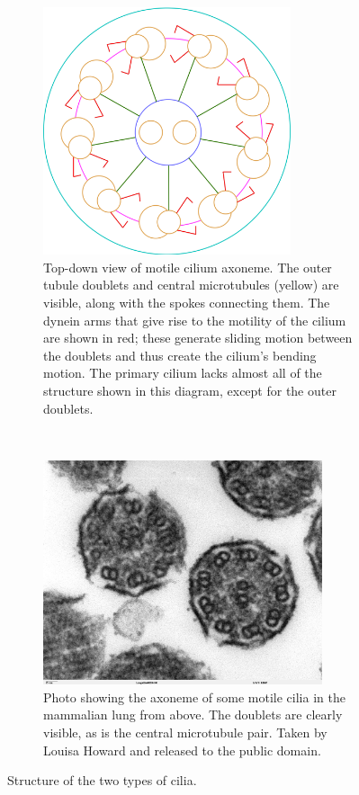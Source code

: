 \begin{figure}
    \begin{subfigure}[t]{0.49\linewidth}
        \centering
        \includegraphics[width=0.8\textwidth]{images_other/axoneme_2d.png}
        \caption{Top-down view of motile cilium axoneme. The outer tubule doublets and central microtubules (yellow) are visible, along with the spokes connecting them. The dynein arms that give rise to the motility of the cilium are shown in red; these generate sliding motion between the doublets and thus create the cilium's bending motion. The primary cilium lacks almost all of the structure shown in this diagram, except for the outer doublets.}
        \label{fig:axoneme_motile_2d}
    \end{subfigure}
    ~
    \begin{subfigure}[t]{0.49\linewidth}
        \centering
        \includegraphics[width=0.9\textwidth]{images_other/lung_cilia_crosssection_howard_pd.jpg}
        \caption{Photo showing the axoneme of some motile cilia in the mammalian lung from above. The doublets are clearly visible, as is the central microtubule pair. Taken by Louisa Howard and released to the public domain.}
        \label{fig:axoneme_sem}
    \end{subfigure}
    
    \caption{Structure of the two types of cilia.}
    \label{fig:axoneme}
\end{figure}

